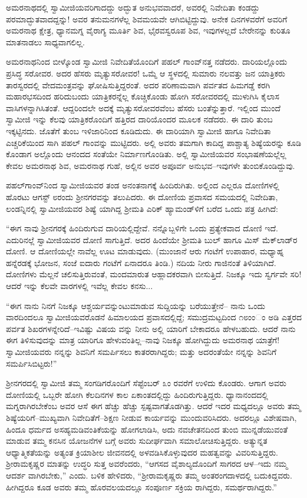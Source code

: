 ಅಮರನಾಥದಲ್ಲಿ ಸ್ವಾಮೀಜಿಯವರಿಗಾದದ್ದು ಅದ್ಭುತ ಅನುಭವವಾದರೆ, ಅವರಲ್ಲಿ ನಿವೇದಿತಾ ಕಂಡದ್ದು ಪರಮಾದ್ಭುತವಾದದ್ದನ್ನು! ಅವರ ತನುಮನಗಳೆಲ್ಲ ಶಿವಮಯವೇ ಆಗಿಬಿಟ್ಟಿದ್ದುವು. ಅನೇಕ ದಿನಗಳವರೆಗೆ ಅವರಿಗೆ ಅಮರನಾಥ ಕ್ಷೇತ್ರ, ಧ್ಯಾನಮಗ್ನ ವೈರಾಗ್ಯ ಮೂರ್ತಿ ಶಿವ, ಭೈರವಸ್ವರೂಪ ಶಿವ, ಇವುಗಳಲ್ಲದೆ ಬೇರೇನನ್ನು ಕುರಿತೂ ಮಾತನಾಡಲು ಸಾಧ್ಯವಾಗಲಿಲ್ಲ.

ಅಮರನಾಥನಿಂದ ಬೀಳ್ಕೊಂಡ ಸ್ವಾಮೀಜಿ ನಿವೇದಿತೆಯೊಂದಿಗೆ ಪಹಲ್ ಗಾಂವ್​ನತ್ತ ನಡೆದರು. ದಾರಿಯಲ್ಲೊಂದು ಪ್ರಸಿದ್ಧ ಸರೋವರ. ಅದರ ಹೆಸರು ಮೃತ್ಯುಸರೋವರ! ಒಮ್ಮೆ ಆ ಸ್ಥಳದಲ್ಲಿ ಸುಮಾರು ನಲವತ್ತು ಜನ ಯಾತ್ರಿಕರು ತಾರಸ್ವರದಲ್ಲಿ ವೇದಮಂತ್ರವನ್ನು ಘೋಷಿಸುತ್ತಿದ್ದರಂತೆ. ಅದರ ಪರಿಣಾಮವಾಗಿ ಪರ್ವತದ ಹಿಮಗಡ್ಡೆ ಕರಗಿ ಮಹಾರಭಸದಿಂದ ಹರಿದುಬಂದು ಯಾತ್ರಿಕರನ್ನೆಲ್ಲ ಕೊಚ್ಚಿಕೊಂಡು ಹೋಗಿ ಸರೋವರದಲ್ಲಿ ಮುಳುಗಿಸಿ ಕೈಲಾಸ ವಾಸಿಗಳನ್ನಾಗಿಸಿತಂತೆ. ಆದ್ದರಿಂದಲೇ ಅದಕ್ಕೆ ಮೃತ್ಯುಸರೋವರವೆಂಬ ಹೆಸರು ಬಂತೆನ್ನುತ್ತಾರೆ. ಇಲ್ಲಿಂದ ಮುಂದೆ ಸ್ವಾಮೀಜಿ ಇನ್ನು ಕೆಲವು ಯಾತ್ರಿಕರೊಂದಿಗೆ ಹತ್ತಿರದ ದಾರಿಯೊಂದರ ಮೂಲಕ ನಡೆದರು. ಈ ದಾರಿ ತುಂಬ ಇಕ್ಕಟ್ಟಿನದು. ಜೊತೆಗೆ ತುಂಬ ಇಳಿಜಾರಿನಿಂದ ಕೂಡಿದುದು. ಈ ದಾರಿಯಾಗಿ ಸ್ವಾಮೀಜಿ ಹಾಗೂ ನಿವೇದಿತಾ ಎಚ್ಚರಿಕೆಯಿಂದ ಸಾಗಿ ಪಹಲ್ ಗಾಂವನ್ನು ಮುಟ್ಟಿದರು. ಅಲ್ಲಿ ಅವರು ತಮಗಾಗಿ ಕಾದಿದ್ದ ಪಾಶ್ಚಾತ್ಯ ಶಿಷ್ಯೆಯರನ್ನು ಕೂಡಿ ಕೊಂಡಾಗ ಅಲ್ಲೊಂದು ಆನಂದದ ಸಂತೆಯೇ ನಿರ್ಮಾಣಗೊಂಡಿತು. ಅಲ್ಲಿ ಸ್ವಾಮೀಜಿಯವರ ಸಂಭಾಷಣೆಯಲ್ಲೆಲ್ಲ ಕೇವಲ ಅಮರನಾಥ ಶಿವ, ಅಮರನಾಥ ಗುಹೆ, ಅಲ್ಲಿನ ಅವರ ಅಪೂರ್ವ ಅನುಭವ–ಇವುಗಳೇ ತುಂಬಿಕೊಂಡಿದ್ದುವು.

ಪಹಲ್​ಗಾಂವ್​ನಿಂದ ಸ್ವಾಮೀಜಿಯವರ ತಂಡ ಅನಂತನಾಗಕ್ಕೆ ಹಿಂದಿರುಗಿತು. ಅಲ್ಲಿಂದ ಎಲ್ಲರೂ ದೋಣಿಗಳಲ್ಲಿ ಹೊರಟು ಆಗಸ್ಟ್ ೮ರಂದು ಶ್ರೀನಗರವನ್ನು ತಲುಪಿದರು. ಈ ದೋಣಿಯ ಪ್ರವಾಸದ ಸಮಯದಲ್ಲಿ ನಿವೇದಿತಾ, ಲಂಡನ್ನಿನಲ್ಲಿ ಸ್ವಾಮೀಜಿಯವರ ಶಿಷ್ಯೆ ಯಾಗಿದ್ದ ಶ್ರೀಮತಿ ಎರಿಕ್ ಹ್ಯಾಮಂಡ್​ಳಿಗೆ ಬರೆದ ಒಂದು ಪತ್ರ ಹೀಗಿದೆ:

“ಈಗ ನಾವು ಶ್ರೀನಗರಕ್ಕೆ ಹಿಂದಿರುಗುವ ದಾರಿಯಲ್ಲಿದ್ದೇವೆ. ನನ್ನೊಬ್ಬಳಿಗೇ ಒಂದು ಪ್ರತ್ಯೇಕವಾದ ದೋಣಿ ಇದೆ. ಎದುರಿನಲ್ಲೆ ಸ್ವಾಮೀಜಿಯವರ ದೋಣಿ ಸಾಗುತ್ತಿದೆ. ಅದರ ಹಿಂದೆಯೇ ಶ್ರೀಮತಿ ಬುಲ್ ಹಾಗೂ ಮಿಸ್ ಮೆಕ್​ಲಾಡ್​ರ ದೋಣಿ. ಆ ದೋಣಿಯಲ್ಲೇ ನಾವೆಲ್ಲ ಊಟ ಮಾಡುವುದು. (ಮುಂಜಾನೆ ಆರು ಗಂಟೆಗೆ ಉಪಾಹಾರ, ಮಧ್ಯಾಹ್ನ ಹನ್ನೆರಡಕ್ಕೆ ಭೋಜನ, ಸಂಜೆ ಐದಾರು ಗಂಟೆಗೆ ಏನಾದರೂ ತಿಂಡಿ.) ನದಿಯ ನೀರು ಗಾಜಿನಂತೆ ತಿಳಿಯಾಗಿದೆ. ದೋಣಿಗಳು ಮೆಲ್ಲನೆ ಚಲಿಸುತ್ತಿರುವಂತೆ, ಮಂದಮಾರುತ ಆಹ್ಲಾದಕರವಾಗಿ ಬೀಸುತ್ತಿದೆ. ನಿಜಕ್ಕೂ ಇದು ಸ್ವರ್ಗವೇ ಸರಿ! ಆದರೆ ಇನ್ನು ಕೆಲವೇ ವಾರಗಳಲ್ಲಿ ಇವೆಲ್ಲ ಕೇವಲ ಕನಸು...

“ಈಗ ನಾನು ನಿನಗೆ ನಿಜಕ್ಕೂ ಆಶ್ಚರ್ಯವನ್ನುಂಟುಮಾಡುವ ಸುದ್ದಿಯನ್ನು ಬರೆಯುತ್ತೇನೆ– ನಾನು ಒಂದು ವಾರದಿಂದಲೂ ಸ್ವಾಮೀಜಿಯವರೊಡನೆ ಹಿಮಾಲಯದ ಪ್ರವಾಸದಲ್ಲಿದ್ದೆ; ಸಮುದ್ರಮಟ್ಟದಿಂದ ೧೮ಂಂಂ ಅಡಿ ಎತ್ತರದ ಪರ್ವತ ಶಿಖರಗಳನ್ನೇರಿದೆ–ಇವಿಷ್ಟು ವಿಷಯ ವನ್ನು ನೀನು ಅಲ್ಲಿ ಯಾರಿಗೆ ಬೇಕಾದರೂ ಹೇಳಬಹುದು. ಆದರೆ ನಾನು ಈಗ ತಿಳಿಸುವುದನ್ನು ಮಾತ್ರ ಯಾರಿಗೂ ಹೇಳುವಂತಿಲ್ಲ–ನಾವು ನಿಜಕ್ಕೂ ಹೋಗಿದ್ದುದು ಅಮರನಾಥ ಯಾತ್ರೆಗೆ! ಸ್ವಾಮೀಜಿಯವರು ನನ್ನನ್ನು ಶಿವನಿಗೆ ಸಮರ್ಪಿಸಲು ಕಾತರರಾಗಿದ್ದರು; ಮತ್ತು ಅದರಂತೆಯೇ ನನ್ನನ್ನು ಶಿವನಿಗೆ ಸಮರ್ಪಿಸಿಬಿಟ್ಟರು!”

ಶ್ರೀನಗರದಲ್ಲಿ ಸ್ವಾಮೀಜಿ ತಮ್ಮ ಸಂಗಡಿಗರೊಂದಿಗೆ ಸೆಪ್ಟೆಂಬರ್ ೩ಂ ರವರೆಗೆ ಉಳಿದು ಕೊಂಡರು. ಆಗಾಗ ಅವರು ದೋಣಿಯಲ್ಲಿ ಒಬ್ಬರೇ ಹೋಗಿ ಕೆಲದಿನಗಳ ಕಾಲ ಏಕಾಂತದಲ್ಲಿದ್ದು ಹಿಂದಿರುಗುತ್ತಿದ್ದರು. ಧ್ಯಾನಾನಂದದಲ್ಲಿ ಮಗ್ನರಾಗಿರಬೇಕೆಂಬ ಅವರ ಆಸೆ ಈಗ ಹೆಚ್ಚು ಹೆಚ್ಚು ಸ್ಪಷ್ಟವಾಗತೊಡಗಿತ್ತು. ಆದರೆ ಇದರ ಮಧ್ಯದಲ್ಲೂ ಅವರು ತಮ್ಮ ಶಿಷ್ಯೆಯರಿಗೆ–ಮುಖ್ಯವಾಗಿ ನಿವೇದಿತೆಗೆ–ಶಿಕ್ಷಣ ನೀಡುವ ಕಾರ್ಯವನ್ನು ಮುಂದುವರಿಸಿದರು. ಅದರಲ್ಲೂ ವಿಶೇಷವಾಗಿ, ಹಿಂದೂ ಧರ್ಮದ ಅಸಹ್ಯಮಡಿವಂತಿಕೆಯನ್ನು ಹೋಗಲಾಡಿಸಿ, ಅದು ನವಚೇತನದಿಂದ ತುಂಬಿ ಮುನ್ನಡೆಯುವಂತೆ ಮಾಡುವ ತಮ್ಮ ಕನಸಿನ ಯೋಜನೆಗಳ ಬಗ್ಗೆ ಅವರು ಸುದೀರ್ಘವಾಗಿ ಸಮಾಲೋಚಿಸುತ್ತಿದ್ದರು. ಅತ್ಯುನ್ನತ ಆಧ್ಯಾತ್ಮಿಕತೆಯನ್ನು ಅತ್ಯಂತ ಕ್ರಿಯಾಶೀಲ ಜೀವನದಲ್ಲಿ ಅಳವಡಿಸಿಕೊಳ್ಳುವುದರ ಮಹತ್ವವನ್ನು ವಿವರಿಸುತ್ತಿದ್ದರು. ಶ್ರೀರಾಮಕೃಷ್ಣರ ಮಾತನ್ನು ಉದ್ಧರಿ ಸುತ್ತ ಅವರೆಂದರು, “ಆಗಸದ ವೈಶಾಲ್ಯದೊಂದಿಗೆ ಸಾಗರದ ಆಳ–ಇದು ನಮ್ಮ ಆದರ್ಶ ವಾಗಿರಬೇಕು,” ಎಂದು. ಬಳಿಕ ಹೇಳಿದರು, “ಶ್ರೀರಾಮಕೃಷ್ಣರು ತಮ್ಮ ಅಂತರಂಗದಾಳದಲ್ಲಿ ಬದುಕಿದ್ದವರು. ಹೀಗಿದ್ದರೂ ಕೂಡ ಅವರು ತಮ್ಮ ಹೊರವಲಯದಲ್ಲೂ ಸಂಪೂರ್ಣ ಸಕ್ರಿಯ ರಾಗಿದ್ದರು, ಸಮರ್ಥರಾಗಿದ್ದರು.”

